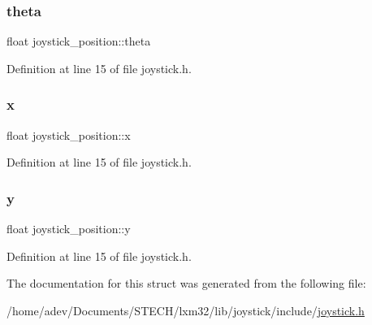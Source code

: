 \subsubsection{\texorpdfstring{theta}{theta}}
{\footnotesize\ttfamily float joystick\+\_\+position\+::theta}



Definition at line 15 of file joystick.\+h.

\mbox{\label{structjoystick__position_a71c3292c1be3c3400a388eac41a47ad3}} 
\subsubsection{\texorpdfstring{x}{x}}
{\footnotesize\ttfamily float joystick\+\_\+position\+::x}



Definition at line 15 of file joystick.\+h.

\mbox{\label{structjoystick__position_ad8fc27fbd5404a4f8cdc1a045a0d689a}} 
\subsubsection{\texorpdfstring{y}{y}}
{\footnotesize\ttfamily float joystick\+\_\+position\+::y}



Definition at line 15 of file joystick.\+h.



The documentation for this struct was generated from the following file\+:\begin{DoxyCompactItemize}
\item 
/home/adev/\+Documents/\+S\+T\+E\+C\+H/lxm32/lib/joystick/include/\hyperlink{joystick_8h}{joystick.\+h}\end{DoxyCompactItemize}
